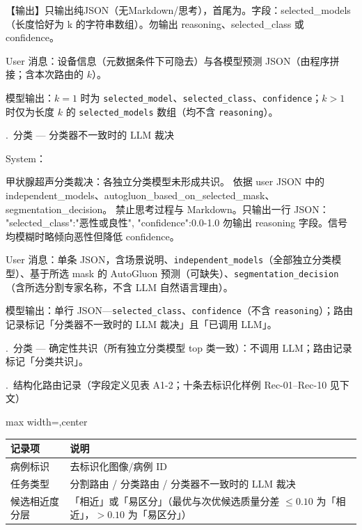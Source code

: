 \begin{responseappendixprose}
\begin{promptverbatim}
【输出】只输出纯JSON（无Markdown/思考），首尾为{}。字段：selected_models（长度恰好为 k 的字符串数组）。勿输出 reasoning、selected_class 或 confidence。
\end{promptverbatim}
User 消息：设备信息（元数据条件下可隐去）与各模型预测 JSON（由程序拼接；含本次路由的 $k$）。\par
模型输出：$k{=}1$ 时为 \texttt{selected\_model}、\texttt{selected\_class}、\texttt{confidence}；$k>1$ 时仅为长度 $k$ 的 \texttt{selected\_models} 数组（均不含 \texttt{reasoning}）。\par
{}.~分类 --- 分类器不一致时的 LLM 裁决
\par
System：\par
\begin{promptverbatim}
甲状腺超声分类裁决：各独立分类模型未形成共识。
依据 user JSON 中的 independent_models、autogluon_based_on_selected_mask、segmentation_decision。
禁止思考过程与 Markdown。只输出一行 JSON：
{"selected_class":"恶性或良性", "confidence":0.0-1.0}
勿输出 reasoning 字段。信号均模糊时略倾向恶性但降低 confidence。
\end{promptverbatim}
User 消息：单条 JSON，含场景说明、\texttt{independent\_models}（全部独立分类模型）、基于所选 mask 的 AutoGluon 预测（可缺失）、\texttt{segmentation\_decision}（含所选分割专家名称，不含 LLM 自然语言理由）。\par
模型输出：单行 JSON---\texttt{selected\_class}、\texttt{confidence}（不含 \texttt{reasoning}）；路由记录标记「分类器不一致时的 LLM 裁决」且「已调用 LLM」。\par
{}.~分类 --- 确定性共识（所有独立分类模型 top 类一致）：不调用 LLM；路由记录标记「分类共识」。
\par
{}.~结构化路由记录（字段定义见表 A1-2；十条去标识化样例 Rec-01--Rec-10 见下文）
\par
\begin{responseinlinetable}
\label{tab_A1_log_fields}
\begin{adjustbox}{max width=\textwidth,center}
\begin{tabular}{ll}
\toprule
记录项 & 说明 \\
\midrule
病例标识 & 去标识化图像/病例 ID \\
任务类型 & 分割路由 / 分类路由 / 分类器不一致时的 LLM 裁决 \\
候选相近度分层 & 「相近」或「易区分」（最优与次优候选质量分差 $\leq 0.10$ 为「相近」，$>0.10$ 为「易区分」） \\

\end{tabular}
\end{adjustbox}
\end{responseinlinetable}
\end{responseappendixprose}
